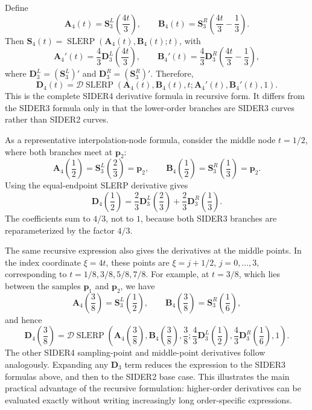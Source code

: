 \documentclass[a4paper,11pt]{article}
\newcommand{\bp}{\mathbf{p}}
\newcommand{\bA}{\mathbf{A}}
\newcommand{\bB}{\mathbf{B}}
\newcommand{\bD}{\mathbf{D}}
\numberwithin{equation}{section}
\theoremstyle{plain}
\theoremstyle{definition}
\theoremstyle{remark}
\newcommand{\slerp}{\operatorname{SLERP}}
\begin{document}
Define
\[
        \bA_4(t)=\mathbf{S}_3^L\!\left(\frac{4t}{3}\right),
        \qquad
        \bB_4(t)=\mathbf{S}_3^R\!\left(\frac{4t}{3}-\frac13\right).
\]
Then \(\mathbf{S}_4(t)=\slerp(\bA_4(t),\bB_4(t);t)\), with
\[
        \bA_4'(t)=\frac43\bD_3^L\!\left(\frac{4t}{3}\right),
        \qquad
        \bB_4'(t)=\frac43\bD_3^R\!\left(\frac{4t}{3}-\frac13\right),
\]
where \(\bD_3^L=(\mathbf{S}_3^L)'\) and \(\bD_3^R=(\mathbf{S}_3^R)'\).  Therefore,
\[
\boxed{
        \bD_4(t)
        =
        \mathcal{D}\slerp
        \left(
        \bA_4(t),\bB_4(t),t;
        \bA_4'(t),\bB_4'(t),1
        \right).
}
\]
This is the complete SIDER4 derivative formula in recursive form.  It differs from the SIDER3 formula only in that the lower-order branches are SIDER3 curves rather than SIDER2 curves.

As a representative interpolation-node formula, consider the middle node \(t=1/2\), where both branches meet at \(\bp_2\):
\[
        \bA_4\!\left(\frac12\right)=\mathbf{S}_3^L\!\left(\frac23\right)=\bp_2,
        \qquad
        \bB_4\!\left(\frac12\right)=\mathbf{S}_3^R\!\left(\frac13\right)=\bp_2.
\]
Using the equal-endpoint SLERP derivative gives
\[
\boxed{
        \bD_4\!\left(\frac12\right)
        =
        \frac23\bD_3^L\!\left(\frac23\right)
        +
        \frac23\bD_3^R\!\left(\frac13\right).
}
\]
The coefficients sum to \(4/3\), not to \(1\), because both SIDER3 branches are reparameterized by the factor \(4/3\).

The same recursive expression also gives the derivatives at the middle points.  In the index coordinate \(\xi=4t\), these points are \(\xi=j+1/2\), \(j=0,\ldots,3\), corresponding to \(t=1/8,3/8,5/8,7/8\).  For example, at \(t=3/8\), which lies between the samples \(\bp_1\) and \(\bp_2\), we have
\[
        \bA_4\!\left(\frac38\right)=\mathbf{S}_3^L\!\left(\frac12\right),
        \qquad
        \bB_4\!\left(\frac38\right)=\mathbf{S}_3^R\!\left(\frac16\right),
\]
and hence
\[
\boxed{
        \bD_4\!\left(\frac38\right)
        =
        \mathcal{D}\slerp
        \left(
        \bA_4\!\left(\frac38\right),
        \bB_4\!\left(\frac38\right),
        \frac38;
        \frac43\bD_3^L\!\left(\frac12\right),
        \frac43\bD_3^R\!\left(\frac16\right),
        1
        \right).
}
\]
The other SIDER4 sampling-point and middle-point derivatives follow analogously.  Expanding any \(\bD_3\) term reduces the expression to the SIDER3 formulas above, and then to the SIDER2 base case.  This illustrates the main practical advantage of the recursive formulation: higher-order derivatives can be evaluated exactly without writing increasingly long order-specific expressions.
\end{document}
